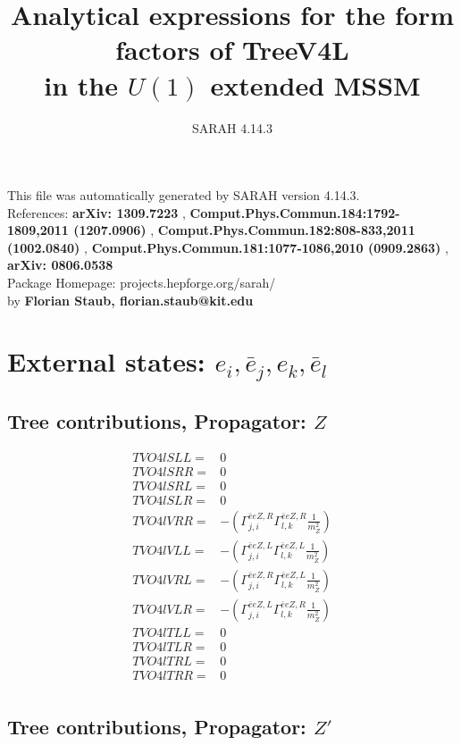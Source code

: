 \documentclass[A4,landscape]{article}
\begin{document}
\title{Analytical expressions for the form factors of TreeV4L\\ in the $U(1)$ extended MSSM } 
 \author{SARAH 4.14.3} 
 \maketitle 
 \vspace{10cm} 
This file was automatically generated by SARAH version 4.14.3.  \\ 
References: {\bf arXiv: 1309.7223 }, {\bf Comput.Phys.Commun.184:1792-1809,2011 (1207.0906) }, {\bf Comput.Phys.Commun.182:808-833,2011 (1002.0840) }, {\bf Comput.Phys.Commun.181:1077-1086,2010 (0909.2863) }, {\bf arXiv: 0806.0538 } \\ 
Package Homepage: projects.hepforge.org/sarah/ \\ 
by {\bf Florian Staub, florian.staub@kit.edu} 
 \pagebreak 
 \tableofcontents 
 \pagebreak 
\section{External states: ${e_{{i}}, \bar{e}_{{j}}, e_{{k}}, \bar{e}_{{l}}}$} 
\subsection{Tree contributions, Propagator: $Z$} 

\begin{align} 
  TVO4lSLL= & 0 \\ 
  TVO4lSRR= & 0 \\ 
  TVO4lSRL= & 0 \\ 
  TVO4lSLR= & 0 \\ 
  TVO4lVRR= & -(\Gamma^{\bar{e}e Z ,R}_{j, i} \Gamma^{\bar{e}e Z ,R}_{l, k} \frac{1}{m^2_{Z}}) \\ 
  TVO4lVLL= & -(\Gamma^{\bar{e}e Z ,L}_{j, i} \Gamma^{\bar{e}e Z ,L}_{l, k} \frac{1}{m^2_{Z}}) \\ 
  TVO4lVRL= & -(\Gamma^{\bar{e}e Z ,R}_{j, i} \Gamma^{\bar{e}e Z ,L}_{l, k} \frac{1}{m^2_{Z}}) \\ 
  TVO4lVLR= & -(\Gamma^{\bar{e}e Z ,L}_{j, i} \Gamma^{\bar{e}e Z ,R}_{l, k} \frac{1}{m^2_{Z}}) \\ 
  TVO4lTLL= & 0 \\ 
  TVO4lTLR= & 0 \\ 
  TVO4lTRL= & 0 \\ 
  TVO4lTRR= & 0 \\ 
\end{align} 
\subsection{Tree contributions, Propagator: ${Z'}$} 
\end{document}
